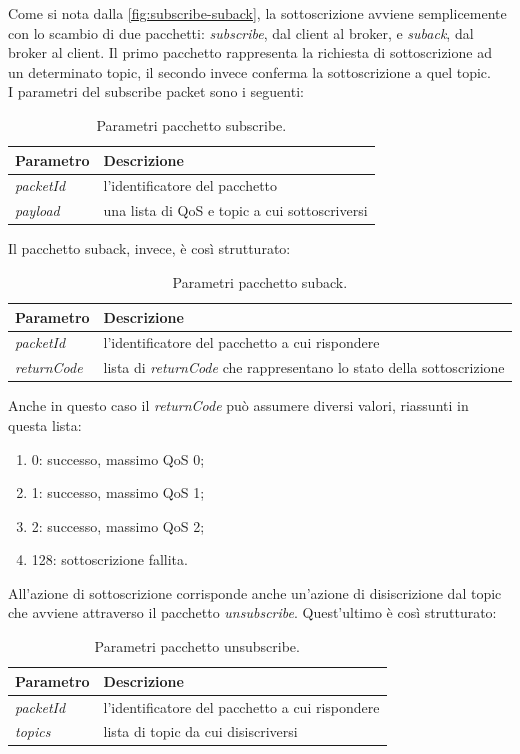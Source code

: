 \documentclass[binding=0.6cm,TFA]{sapthesis}
\begin{document}
\begin{large}
Come si nota dalla \autoref{fig:subscribe-suback}, la sottoscrizione avviene semplicemente con lo scambio di due pacchetti: \textit{subscribe}, dal client al broker, e \textit{suback}, dal broker al client. Il primo pacchetto rappresenta la richiesta di sottoscrizione ad un determinato topic, il secondo invece conferma la sottoscrizione a quel topic. \\
I parametri del subscribe packet sono i seguenti:

\begin{table}[h]
\caption{Parametri pacchetto subscribe.}
\label{tab:subscribe}
\begin{tabular}{lp{}}
\toprule
\textbf{Parametro} & \textbf{Descrizione} \\
\midrule
\textit{packetId} & l'identificatore del pacchetto \\
\textit{payload} & una lista di QoS e topic a cui sottoscriversi \\
\bottomrule
\end{tabular}
\end{table}
Il pacchetto suback, invece, è così strutturato:
\begin{table}[h]
\caption{Parametri pacchetto suback.}
\label{tab:suback}
\begin{tabular}{lp{}}
\toprule
\textbf{Parametro} & \textbf{Descrizione} \\
\midrule
\textit{packetId} & l'identificatore del pacchetto a cui rispondere \\
\textit{returnCode} & lista di \textit{returnCode} che rappresentano lo stato della sottoscrizione \\
\bottomrule
\end{tabular}
\end{table}

Anche in questo caso il \textit{returnCode} può assumere diversi valori, riassunti in questa lista:
\begin{enumerate}
\item 0: successo, massimo QoS 0;
\item 1: successo, massimo QoS 1;
\item 2: successo, massimo QoS 2;
\item 128: sottoscrizione fallita.
\end{enumerate}

All'azione di sottoscrizione corrisponde anche un'azione di disiscrizione dal topic che avviene attraverso il pacchetto \textit{unsubscribe}. Quest'ultimo è così strutturato:
\begin{table}[h]
\caption{Parametri pacchetto unsubscribe.}
\label{tab:unsubscribe}
\begin{tabular}{lp{}}
\toprule
\textbf{Parametro} & \textbf{Descrizione} \\
\midrule
\textit{packetId} & l'identificatore del pacchetto a cui rispondere \\
\textit{topics} & lista di topic da cui disiscriversi \\
\bottomrule
\end{tabular}
\end{table}


\end{large}
\end{document}
